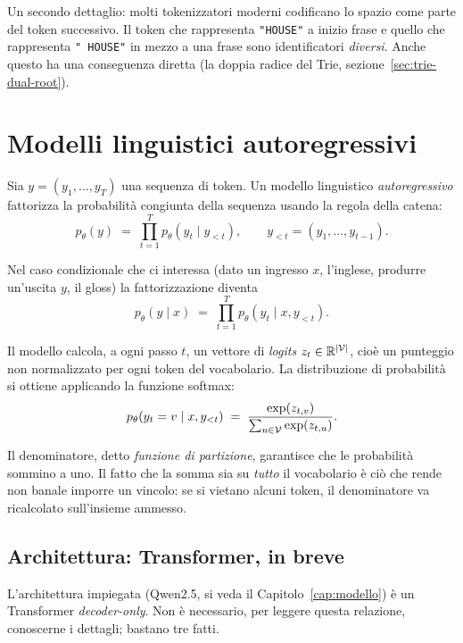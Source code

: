 Un secondo dettaglio: molti tokenizzatori moderni codificano lo spazio come
parte del token successivo. Il token che rappresenta \texttt{"HOUSE"} a inizio
frase e quello che rappresenta \texttt{"~HOUSE"} in mezzo a una frase sono
identificatori \emph{diversi}. Anche questo ha una conseguenza diretta
(la doppia radice del Trie, sezione~\ref{sec:trie-dual-root}).

\section{Modelli linguistici autoregressivi}

Sia $y = (y_1, \dots, y_T)$ una sequenza di token. Un modello linguistico
\emph{autoregressivo} fattorizza la probabilità congiunta della sequenza usando
la regola della catena:
\begin{equation}
  p_\theta(y) \;=\; \prod_{t=1}^{T} p_\theta(y_t \mid y_{<t}),
  \qquad y_{<t} = (y_1, \dots, y_{t-1}).
\end{equation}

Nel caso condizionale che ci interessa (dato un ingresso $x$, l'inglese,
produrre un'uscita $y$, il gloss) la fattorizzazione diventa
\begin{equation}
  \label{eq:ar-cond}
  p_\theta(y \mid x) \;=\; \prod_{t=1}^{T} p_\theta(y_t \mid x, y_{<t}).
\end{equation}

Il modello calcola, a ogni passo $t$, un vettore di \emph{logits}
$z_t \in \mathbb{R}^{|\mathcal{V}|}$, cioè un punteggio non normalizzato per ogni
token del vocabolario. La distribuzione di probabilità si ottiene applicando la
funzione softmax:
\begin{equation}
  \label{eq:softmax}
  p_\theta(y_t = v \mid x, y_{<t})
  \;=\;
  \frac{\exp(z_{t,v})}{\sum_{u \in \mathcal{V}} \exp(z_{t,u})}.
\end{equation}

Il denominatore, detto \emph{funzione di partizione}, garantisce che le
probabilità sommino a uno. Il fatto che la somma sia su \emph{tutto} il
vocabolario è ciò che rende non banale imporre un vincolo: se si vietano alcuni
token, il denominatore va ricalcolato sull'insieme ammesso.

\subsection{Architettura: Transformer, in breve}

L'architettura impiegata (Qwen2.5, si veda il Capitolo~\ref{cap:modello}) è un
Transformer \emph{decoder-only}. Non è necessario, per leggere questa relazione,
conoscerne i dettagli; bastano tre fatti.


